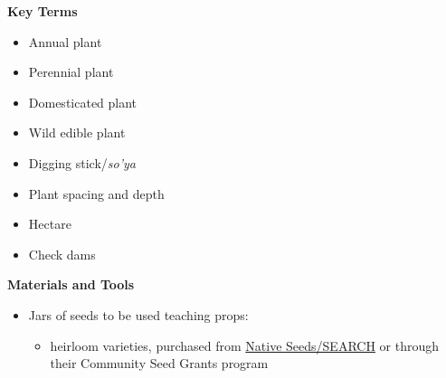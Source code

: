 \documentclass[12pt,]{article}
\providecommand{\tightlist}{%
  \setlength{\itemsep}{0pt}\setlength{\parskip}{0pt}}
\begin{document}
\textbf{Key Terms}

\begin{itemize}
\tightlist
\item
  Annual plant
\item
  Perennial plant
\item
  Domesticated plant
\item
  Wild edible plant
\item
  Digging stick/\emph{so'ya}
\item
  Plant spacing and depth
\item
  Hectare
\item
  Check dams
\end{itemize}

\textbf{Materials and Tools}

\begin{itemize}
\tightlist
\item
  Jars of seeds to be used teaching props:

  \begin{itemize}
  \tightlist
  \item
    heirloom varieties, purchased from \href{http://www.nativeseeds.org/}{Native Seeds/SEARCH} or through their Community Seed Grants program


\end{itemize}
\end{itemize}
\end{document}
